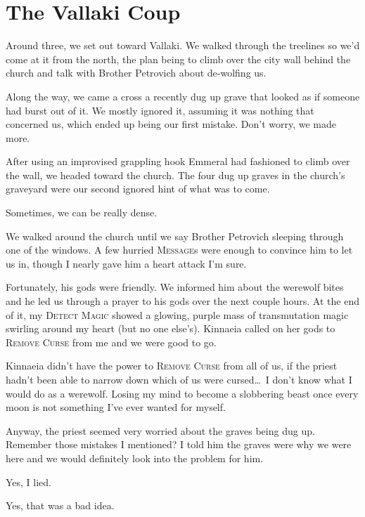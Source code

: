 
\section*{The Vallaki Coup}
Around three, we set out toward Vallaki. We walked through the treelines so we'd come at it from the north, the plan being to climb over the city wall behind the church and talk with Brother Petrovich about de-wolfing us.

Along the way, we came a cross a recently dug up grave that looked as if someone had burst out of it. We mostly ignored it, assuming it was nothing that concerned us, which ended up being our first mistake. Don't worry, we made more.

After using an improvised grappling hook Emmeral had fashioned to climb over the wall, we headed toward the church. The four dug up graves in the church's graveyard were our second ignored hint of what was to come.

Sometimes, we can be really dense.

We walked around the church until we say Brother Petrovich sleeping through one of the windows. A few hurried \textsc{Message}s were enough to convince him to let us in, though I nearly gave him a heart attack I'm sure.

Fortunately, his gods were friendly. We informed him about the werewolf bites and he led us through a prayer to his gods over the next couple hours. At the end of it, my \textsc{Detect Magic} showed a glowing, purple mass of transmutation magic swirling around my heart (but no one else's). Kinnaeia called on her gods to \textsc{Remove Curse} from me and we were good to go.

Kinnaeia didn't have the power to \textsc{Remove Curse} from all of us, if the priest hadn't been able to narrow down which of us were cursed\dots\ I don't know what I would do as a werewolf. Losing my mind to become a slobbering beast once every moon is not something I've ever wanted for myself.

Anyway, the priest seemed very worried about the graves being dug up. Remember those mistakes I mentioned? I told him the graves were why we were here and we would definitely look into the problem for him.

Yes, I lied.

Yes, that was a bad idea.

